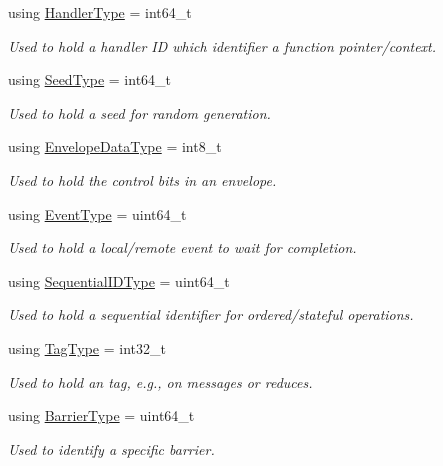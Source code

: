 \begin{DoxyCompactItemize}
using \hyperlink{namespacevt_af64846b57dfcaf104da3ef6967917573}{Handler\+Type} = int64\+\_\+t
\begin{DoxyCompactList}\small\item\em Used to hold a handler ID which identifier a function pointer/context. \end{DoxyCompactList}\item 
using \hyperlink{namespacevt_ae2e13198bdef4d5b8e603d6c1c7f0969}{Seed\+Type} = int64\+\_\+t
\begin{DoxyCompactList}\small\item\em Used to hold a seed for random generation. \end{DoxyCompactList}\item 
using \hyperlink{namespacevt_a2740126d59f361d9ba46f66b3b4b0d3d}{Envelope\+Data\+Type} = int8\+\_\+t
\begin{DoxyCompactList}\small\item\em Used to hold the control bits in an envelope. \end{DoxyCompactList}\item 
using \hyperlink{namespacevt_a009267401def7ae8bf201892222d060f}{Event\+Type} = uint64\+\_\+t
\begin{DoxyCompactList}\small\item\em Used to hold a local/remote event to wait for completion. \end{DoxyCompactList}\item 
using \hyperlink{namespacevt_a3063d4db3b879d6dd2c7b8d50995c7f6}{Sequential\+I\+D\+Type} = uint64\+\_\+t
\begin{DoxyCompactList}\small\item\em Used to hold a sequential identifier for ordered/stateful operations. \end{DoxyCompactList}\item 
using \hyperlink{namespacevt_a84ab281dae04a52a4b243d6bf62d0e52}{Tag\+Type} = int32\+\_\+t
\begin{DoxyCompactList}\small\item\em Used to hold an tag, e.\+g., on messages or reduces. \end{DoxyCompactList}\item 
using \hyperlink{namespacevt_a25e481f0d6bbc7204db23d1c87a62e77}{Barrier\+Type} = uint64\+\_\+t
\begin{DoxyCompactList}\small\item\em Used to identify a specific barrier. \end{DoxyCompactList}\item 

\end{DoxyCompactItemize}
